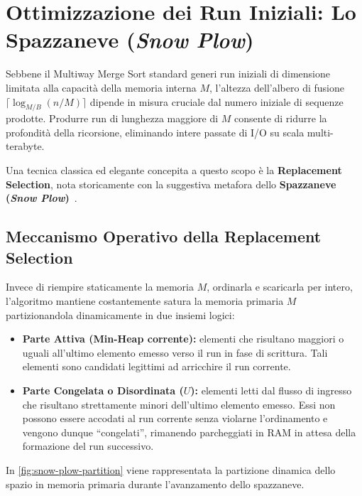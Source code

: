 \FloatBarrier
\section{Ottimizzazione dei Run Iniziali: Lo Spazzaneve (\texorpdfstring{\emph{Snow Plow}}{Snow Plow})}
\label{sec:snow-plow}

Sebbene il Multiway Merge Sort standard generi run iniziali di dimensione limitata alla capacità della memoria interna $M$, l'altezza dell'albero di fusione $\lceil \log_{M/B}(n/M) \rceil$ dipende in misura cruciale dal numero iniziale di sequenze prodotte. Produrre run di lunghezza maggiore di $M$ consente di ridurre la profondità della ricorsione, eliminando intere passate di I/O su scala multi-terabyte.

Una tecnica classica ed elegante concepita a questo scopo è la \textbf{Replacement Selection}, nota storicamente con la suggestiva metafora dello \textbf{Spazzaneve (\emph{Snow Plow})}~\cite{knuth1997}.

\FloatBarrier
\subsection{Meccanismo Operativo della Replacement Selection}
\label{subsec:snow-plow-mechanism}

Invece di riempire staticamente la memoria $M$, ordinarla e scaricarla per intero, l'algoritmo mantiene costantemente satura la memoria primaria $M$ partizionandola dinamicamente in due insiemi logici:
\begin{itemize}
  \item \textbf{Parte Attiva (Min-Heap corrente):} elementi che risultano maggiori o uguali all'ultimo elemento emesso verso il run in fase di scrittura. Tali elementi sono candidati legittimi ad arricchire il run corrente.
  \item \textbf{Parte Congelata o Disordinata ($U$):} elementi letti dal flusso di ingresso che risultano strettamente minori dell'ultimo elemento emesso. Essi non possono essere accodati al run corrente senza violarne l'ordinamento e vengono dunque ``congelati'', rimanendo parcheggiati in RAM in attesa della formazione del run successivo.
\end{itemize}

In \autoref{fig:snow-plow-partition} viene rappresentata la partizione dinamica dello spazio in memoria primaria durante l'avanzamento dello spazzaneve.

